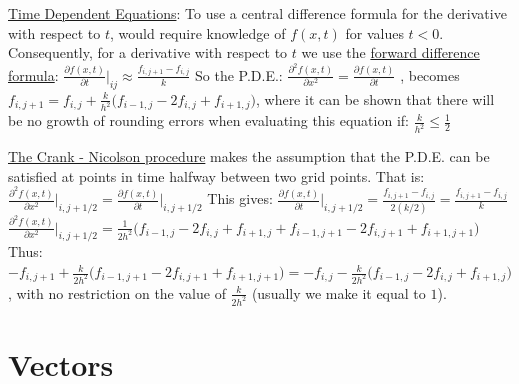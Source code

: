 \documentclass[12pt]{article}
\begin{document}
\begin{flushleft}
	\textbullet \quad \uline{Time Dependent Equations}: To use a central difference formula for the derivative with respect to $t$, would require knowledge of $f(x,t)$ for values $t<0$. Consequently, for a derivative with respect to $t$ we use the \uline{forward difference formula}: $\displaystyle \frac{\partial f(x,t)}{\partial t} \big|_{ij} \approx \frac{f_{i,j+1}-f_{i,j}}{k} $ \linebreak 
	So the P.D.E.: $\displaystyle \frac{\partial^2 f(x,t)}{\partial x^2} = \frac{\partial f(x,t)}{\partial t}$ , becomes $\displaystyle f_{i,j+1} = f_{i,j} + \frac{k}{h^2} \big( f_{i-1,j} -2f_{i,j} + f_{i+1,j} \big)$, where it can be shown that there will be no growth of rounding errors when evaluating this equation if: $\displaystyle \frac{k}{h^2} \leq \frac{1}{2}$ \linebreak 
	
	\textbullet \quad \uline{The Crank - Nicolson procedure} makes the assumption that the P.D.E. can be satisfied at points in time halfway between two grid points. That is: \linebreak 
	$\displaystyle \frac{\partial^2 f(x,t)}{\partial x^2} \big|_{i,j+1/2} = \frac{\partial f(x,t)}{\partial t} \big|_{i,j+1/2}$ This gives: \linebreak 
	$\displaystyle \frac{\partial f(x,t)}{\partial t} \big|_{i,j+1/2} = \frac{f_{i,j+1}-f_{i,j}}{2(k/2)} = \frac{f_{i,j+1}-f_{i,j}}{k}$ \linebreak 
	$\displaystyle \frac{\partial^2 f(x,t)}{\partial x^2} \big|_{i,j+1/2} = \frac{1}{2h^2} \big( f_{i-1,j} -2f_{i,j} + f_{i+1,j} + f_{i-1,j+1} -2f_{i,j+1} + f_{i+1,j+1} \big)$ \linebreak 
	Thus: $\displaystyle -f_{i,j+1} + \frac{k}{2h^2} \big( f_{i-1,j+1} -2f_{i,j+1} + f_{i+1,j+1} \big) = -f_{i,j} - \frac{k}{2h^2} \big( f_{i-1,j} -2f_{i,j} + f_{i+1,j} \big) $ \linebreak 
	, with no restriction on the value of $\displaystyle \frac{k}{2h^2}$ (usually we make it equal to $1$). \linebreak 

	
	\pagebreak
	
	
	\section{Vectors}
	

\end{flushleft}
\end{document}

